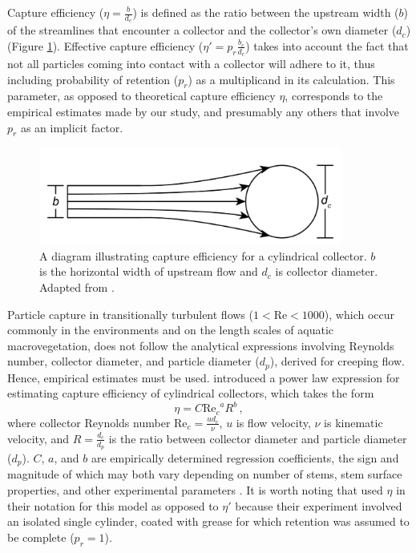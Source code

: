 \documentclass{scrreprt}
\newcommand\Rey{\mathrm{Re}}
\begin{document}
Capture efficiency ($\eta=\frac{b}{d_c}$) is defined as the ratio between the upstream width ($b$) of the streamlines that encounter a collector and the collector's own diameter ($d_c$) (Figure \ref{fig:capeff}). Effective capture efficiency ($\eta\prime=p_r\frac{b_c}{d_c}$) takes into account the fact that not all particles coming into contact with a collector will adhere to it, thus including probability of retention ($p_r$) as a multiplicand in its calculation. This parameter, as opposed to theoretical capture efficiency $\eta$, corresponds to the empirical estimates made by our study, and presumably any others that involve $p_r$ as an implicit factor.

\begin{figure}[htbp]
\includegraphics[width=10cm]{collectorefficiency.png}
\centering
\caption{A diagram illustrating capture efficiency for a cylindrical collector. $b$ is the horizontal width of upstream flow and $d_c$ is collector diameter. Adapted from \citet{Palmer_2004}.}
\label{fig:capeff}
\end{figure}

Particle capture in transitionally turbulent flows ($1<\Rey<1000$), which occur commonly in the environments and on the length scales of aquatic macrovegetation, does not follow the analytical expressions involving Reynolds number, collector diameter, and particle diameter ($d_p$), derived for creeping flow. Hence, empirical estimates must be used. \citet{Palmer_2004} introduced a power law expression for estimating capture efficiency of cylindrical collectors, which takes the form \[\eta=C{\Rey_c}^{a}R^{b}\,,\] where collector Reynolds number $\Rey_c=\frac{ud_c}{\nu}$, $u$ is flow velocity, $\nu$ is kinematic velocity, and $R=\frac{d_c}{d_p}$ is the ratio between collector diameter and particle diameter ($d_p$). $C$, $a$, and $b$ are empirically determined regression coefficients, the sign and magnitude of which may both vary depending on number of stems, stem surface properties, and other experimental parameters \citep[e.g.,][]{Palmer_2004, Fauria_2015}. It is worth noting that \citet{Palmer_2004} used $\eta$ in their notation for this model as opposed to $\eta\prime$ because their experiment involved an isolated single cylinder, coated with grease for which retention was assumed to be complete ($p_r = 1$).
\end{document}
